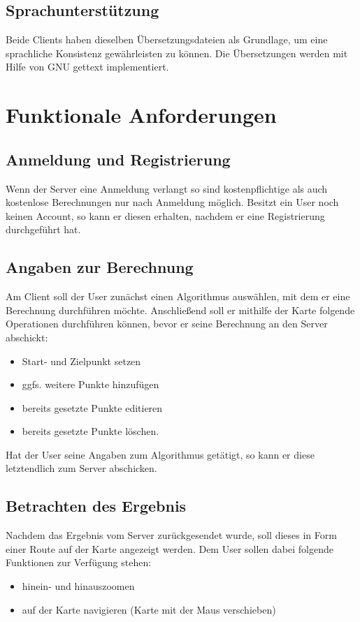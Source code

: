 \documentclass[a4paper,10pt,titlepage]{article}
\begin{document}
\subsection{Sprachunterstützung}
Beide Clients haben dieselben Übersetzungsdateien als Grundlage, um eine sprachliche Konsistenz gewährleisten zu können.
Die Übersetzungen werden mit Hilfe von GNU gettext implementiert.

\clearpage
\section{Funktionale Anforderungen}

\subsection{Anmeldung und Registrierung}
Wenn der Server eine Anmeldung verlangt so sind kostenpflichtige als auch kostenlose Berechnungen nur nach Anmeldung möglich. Besitzt ein User noch keinen Account, so kann er diesen erhalten, nachdem er eine Registrierung durchgeführt hat.

\subsection{Angaben zur Berechnung}
Am Client soll der User zunächst einen Algorithmus auswählen, mit dem er eine Berechnung durchführen möchte.
Anschließend soll er mithilfe der Karte folgende Operationen durchführen können, bevor er seine Berechnung an den Server abschickt:
\begin{itemize}
 \item Start- und Zielpunkt setzen
 \item ggfs. weitere Punkte hinzufügen
 \item bereits gesetzte Punkte editieren
 \item bereits gesetzte Punkte löschen.
\end{itemize}
Hat der User seine Angaben zum Algorithmus getätigt, so kann er diese letztendlich zum Server abschicken.

\subsection{Betrachten des Ergebnis}
Nachdem das Ergebnis vom Server zurückgesendet wurde, soll dieses in Form einer Route auf der Karte angezeigt werden.
Dem User sollen dabei folgende Funktionen zur Verfügung stehen:
\begin{itemize}
 \item hinein- und hinauszoomen
 \item auf der Karte navigieren (Karte mit der Maus verschieben)
\end{itemize}
\end{document}
